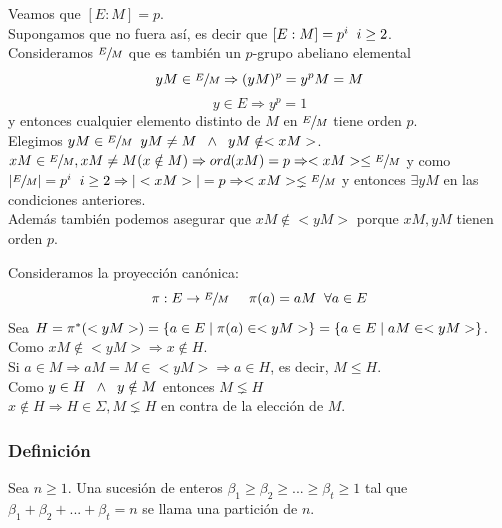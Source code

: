 \documentclass[11pt,a4paper]{article}
\begin{document}
Veamos que $[E:M] = p$. \\
Supongamos que no fuera así, es decir que $[E:M] = p^{i} \hspace{0.2cm} i \geq 2$. \\
Consideramos $\sfrac{E}{M}$ que es también un $p$-grupo abeliano elemental
$$yM \in \sfrac{E}{M} \Rightarrow (yM)^{p} = y^{p}M = M$$
$$y \in E \Rightarrow y^{p} = 1$$
y entonces cualquier elemento distinto de $M$ en $\sfrac{E}{M}$ tiene orden $p$. \\
Elegimos $yM \in \sfrac{E}{M} \hspace{0.2cm} yM \neq M \hspace{0.2cm} \wedge \hspace{0.2cm} yM \notin <xM>$. \\
$xM \in \sfrac{E}{M}, xM \neq M (x \notin M) \Rightarrow ord(xM) = p \Rightarrow <xM> \leq \sfrac{E}{M}$ y como $|\sfrac{E}{M}| = p^{i} \hspace{0.2cm} i \geq 2 \Rightarrow |<xM>| = p\Rightarrow <xM> \lneq \sfrac{E}{M}$ y entonces $\exists yM$ en las condiciones anteriores. \\
Además también podemos asegurar que $xM \notin <yM>$ porque $xM, yM$ tienen orden $p$.

Consideramos la proyección canónica:
$$\pi: E \to \sfrac{E}{M} \hspace{0.5cm} \pi(a) = aM \hspace{0.2cm} \forall a \in E$$
Sea $H = \pi^{*}(<yM>) = \{a \in E \mid \pi(a) \in <yM>\} = \\ \{a \in E \mid aM \in <yM>\}$. \\
Como $xM \notin <yM> \Rightarrow x \notin H$. \\
Si $a \in M \Rightarrow aM = M \in <yM> \Rightarrow a \in H$, es decir, $M \leqslant H$. \\
Como $y \in H \hspace{0.2cm} \wedge \hspace{0.2cm} y \notin M$ entonces $M \lneq H$ \\
$x \notin H \Rightarrow H \in \Sigma, M \lneq H$ en contra de la elección de $M$.


\subsubsection*{Definición}

Sea $n \geq 1$. Una sucesión de enteros $\beta_{1} \geq \beta_{2} \geq ... \geq \beta_{t} \geq 1$ tal que $\beta_{1} + \beta_{2} + ... + \beta_{t} = n$ se llama una partición de $n$.
\end{document}
